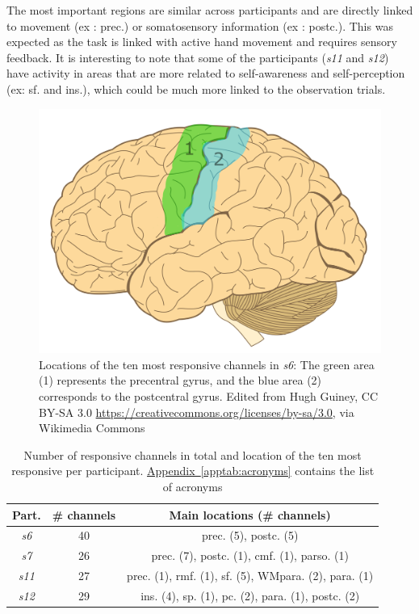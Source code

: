 \documentclass[10pt,conference,compsocconf]{IEEEtran}
\newcommand{\aref}[1]{\hyperref[#1]{Appendix~\ref*{#1}}}
\begin{document}
The most important regions are similar across participants and are directly linked to movement (ex : prec.) or somatosensory information (ex : postc.). This was expected as the task is linked with active hand movement and requires sensory feedback. It is interesting to note that some of the participants (\textit{s11} and \textit{s12}) have activity in areas that are more related to self-awareness and self-perception (ex: sf. and ins.), which could be much more linked to the observation trials.

\vspace{-1em}

\begin{figure}[h!]
    \center
    \includegraphics[width=0.7\linewidth]{images/Human-brain.png}
    \caption{Locations of the ten most responsive channels in \textit{s6}: The green area (1) represents the precentral gyrus, and the blue area (2) corresponds to the postcentral gyrus. Edited from Hugh Guiney, CC BY-SA 3.0 \url{https://creativecommons.org/licenses/by-sa/3.0}, via Wikimedia Commons}
    \label{fig:s6actionrecogchannels}
\end{figure}
\FloatBarrier

\begin{table}[h!]
    \centering
    \begin{tabular}{| c | c | c |}
        \hline
        Part. & \# channels & Main locations (\# channels) \\
        \hline
        \textit{s6} & 40 & prec. (5), postc. (5) \\
        \hline
        \textit{s7} & 26 & prec. (7), postc. (1), cmf. (1), parso. (1) \\
        \hline
        \textit{s11} & 27 & prec. (1),  rmf. (1), sf. (5), WMpara. (2), para. (1) \\
        \hline
        \textit{s12} & 29 & ins. (4), sp. (1), pc. (2), para. (1), postc. (2) \\
        \hline
    \end{tabular}
    \caption{Number of responsive channels in total and location of the ten most responsive per participant. \aref{apptab:acronyms} contains the list of acronyms}
    \label{tab:actionrecogchannellocations}
\end{table}
\end{document}
